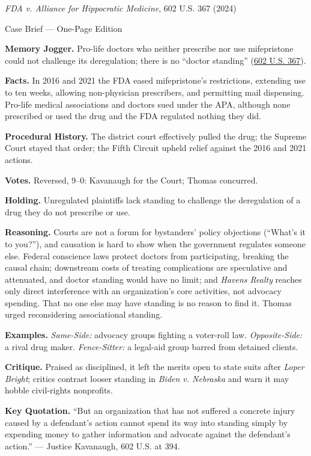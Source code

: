 \documentclass[12pt]{article}
\begin{document}
\begin{center}
{\Large \textit{FDA v. Alliance for Hippocratic Medicine}, 602 U.S. 367 (2024)\par}
\vspace{0.3em}
{\normalsize Case Brief --- One-Page Edition\par}
\end{center}

\textbf{Memory Jogger.} Pro-life doctors who neither prescribe nor use mifepristone could not challenge its deregulation; there is no ``doctor standing'' (\href{https://www.supremecourt.gov/opinions/23pdf/602us1r35_bqmd.pdf}{602 U.S. 367}).

\textbf{Facts.} In 2016 and 2021 the FDA eased mifepristone's restrictions, extending use to ten weeks, allowing non-physician prescribers, and permitting mail dispensing. Pro-life medical associations and doctors sued under the APA, although none prescribed or used the drug and the FDA regulated nothing they did.

\textbf{Procedural History.} The district court effectively pulled the drug; the Supreme Court stayed that order; the Fifth Circuit upheld relief against the 2016 and 2021 actions.

\textbf{Votes.} Reversed, 9--0: Kavanaugh for the Court; Thomas concurred.

\textbf{Holding.} Unregulated plaintiffs lack standing to challenge the deregulation of a drug they do not prescribe or use.

\textbf{Reasoning.} Courts are not a forum for bystanders' policy objections (``What's it to you?''), and causation is hard to show when the government regulates someone else. Federal conscience laws protect doctors from participating, breaking the causal chain; downstream costs of treating complications are speculative and attenuated, and doctor standing would have no limit; and \textit{Havens Realty} reaches only direct interference with an organization's core activities, not advocacy spending. That no one else may have standing is no reason to find it. Thomas urged reconsidering associational standing.

\textbf{Examples.} \emph{Same-Side:} advocacy groups fighting a voter-roll law. \emph{Opposite-Side:} a rival drug maker. \emph{Fence-Sitter:} a legal-aid group barred from detained clients.

\textbf{Critique.} Praised as disciplined, it left the merits open to state suits after \textit{Loper Bright}; critics contrast looser standing in \textit{Biden v. Nebraska} and warn it may hobble civil-rights nonprofits.

\textbf{Key Quotation.} ``But an organization that has not suffered a concrete injury caused by a defendant's action cannot spend its way into standing simply by expending money to gather information and advocate against the defendant's action.'' --- Justice Kavanaugh, 602 U.S. at 394.
\end{document}
